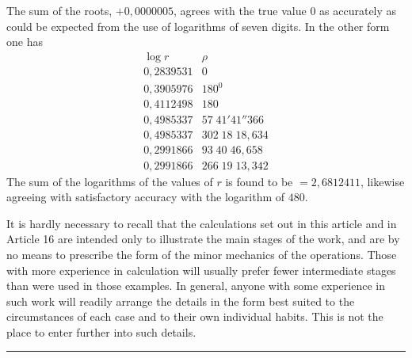 The sum of the roots, $+0{,}0000005$, agrees with the true value $0$ as accurately as could be expected from the use of logarithms of seven digits. In the other form one has
\[
\begin{array}{r|r}
\log r&\rho\\\hline
0{,}2839531&0\\
0{,}3905976&180^{0}\\
0{,}4112498&180\\
0{,}4985337&57\;41'41''366\\
0{,}4985337&302\;18\;18{,}634\\
0{,}2991866&93\;40\;46{,}658\\
0{,}2991866&266\;19\;13{,}342
\end{array}
\]
The sum of the logarithms of the values of $r$ is found to be $=2{,}6812411$, likewise agreeing with satisfactory accuracy with the logarithm of $480$.

It is hardly necessary to recall that the calculations set out in this article and in Article 16 are intended only to illustrate the main stages of the work, and are by no means to prescribe the form of the minor mechanics of the operations. Those with more experience in calculation will usually prefer fewer intermediate stages than were used in those examples. In general, anyone with some experience in such work will readily arrange the details in the form best suited to the circumstances of each case and to their own individual habits. This is not the place to enter further into such details.
\begin{center}\rule{0.25\linewidth}{0.3pt}\end{center}

